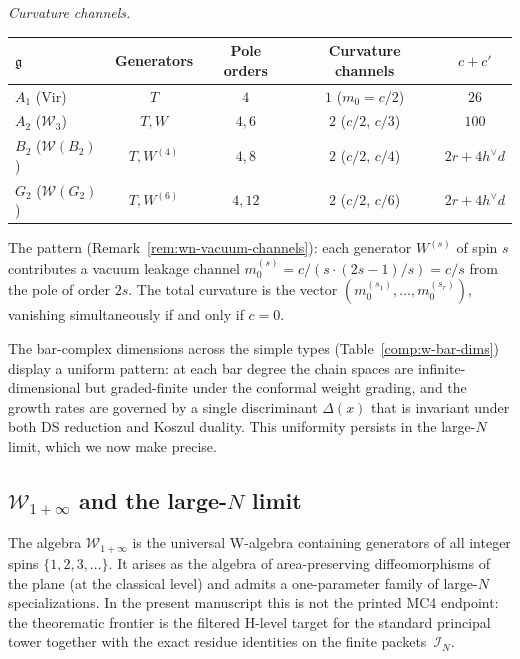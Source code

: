 \begin{computation}
\emph{Curvature channels.}
\begin{center}
\renewcommand{\arraystretch}{1.2}
\begin{tabular}{l|ccc|c}
$\mathfrak{g}$ & Generators & Pole orders & Curvature channels &
$c + c'$ \\
\hline
$A_1$ (Vir) & $T$ & $4$ & $1$ ($m_0 = c/2$) & $26$ \\
$A_2$ ($\mathcal{W}_3$) & $T, W$ & $4, 6$ & $2$ ($c/2$, $c/3$) & $100$ \\
$B_2$ ($\mathcal{W}(B_2)$) & $T, W^{(4)}$ & $4, 8$ & $2$ ($c/2$, $c/4$) &
$2r + 4h^\vee d$ \\
$G_2$ ($\mathcal{W}(G_2)$) & $T, W^{(6)}$ & $4, 12$ & $2$ ($c/2$, $c/6$) &
$2r + 4h^\vee d$
\end{tabular}
\end{center}
The pattern (Remark~\ref{rem:wn-vacuum-channels}): each generator
$W^{(s)}$ of spin $s$ contributes a vacuum leakage channel
$m_0^{(s)} = c/(s \cdot (2s-1)/s) = c/s$ from the pole of order
$2s$.  The total curvature is the vector $(m_0^{(s_1)}, \ldots,
m_0^{(s_r)})$, vanishing simultaneously if and only if $c = 0$.
\end{computation}

The bar-complex dimensions across the simple types (Table~\ref{comp:w-bar-dims}) display a uniform pattern: at each bar degree the chain spaces are infinite-dimensional but graded-finite under the conformal weight grading, and the growth rates are governed by a single discriminant $\Delta(x)$ that is invariant under both DS reduction and Koszul duality.  This uniformity persists in the large-$N$ limit, which we now make precise.

\subsection{\texorpdfstring{$\mathcal{W}_{1+\infty}$ and the large-$N$ limit}{W(1+infinity) and the large-N limit}}
\label{sec:w-infty}

The algebra $\mathcal{W}_{1+\infty}$ is the universal W-algebra
containing generators of all integer spins $\{1, 2, 3, \ldots\}$.
It arises as the algebra of area-preserving diffeomorphisms of the plane
(at the classical level) and admits a one-parameter family of large-$N$
specializations.  In the present manuscript this is not the printed
MC4 endpoint: the theorematic frontier is the filtered H-level target
for the standard principal tower together with the exact residue
identities on the finite packets~$\mathcal{I}_N$.

